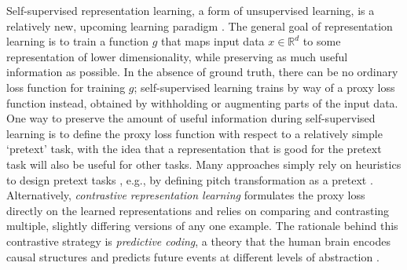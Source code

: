 Self-supervised representation learning, a form of unsupervised learning, is a relatively new, upcoming learning paradigm \cite{dosovitskiy2015discriminative, oord_representation_2019, hjelm_learning_2019,chen_simple_2020}.
The general goal of representation learning is to train a function $g$ that maps input data $x \in \mathbb{R}^d$ to some representation of lower dimensionality, while preserving as much useful information as possible. In the absence of ground truth, there can be no ordinary loss function for training $g$; self-supervised learning trains by way of a proxy loss function instead, obtained by withholding or augmenting parts of the input data. One way to preserve the amount of useful information during self-supervised learning is to define the proxy loss function with respect to a relatively simple `pretext' task, with the idea that a representation that is good for the pretext task will also be useful for other tasks. Many approaches simply rely on heuristics to design pretext tasks \cite{doersch_unsupervised_2015,zhang2016colorful}, e.g., by defining pitch transformation as a pretext \cite{spice}. Alternatively, \emph{contrastive representation learning} formulates the proxy loss directly on the learned representations and relies on comparing and contrasting multiple, slightly differing versions of any one example. The rationale behind this contrastive strategy is \emph{predictive coding}, a theory that the human brain encodes causal structures and predicts future events at different levels of abstraction \cite{friston_predictive_2009}.



